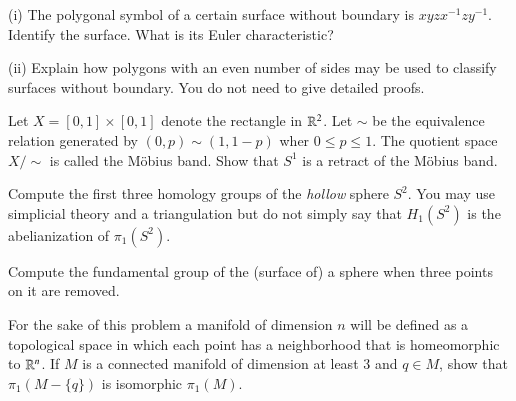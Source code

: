 \documentclass[12pt]{exam}
\theoremstyle{definition}
\newcommand{\R}{\mathcal{R}}
\def\R{{ \Bbb R}}
\begin{document}
\begin{questions}




\question

(i) The polygonal symbol of a certain surface without boundary is $xyzx^{-1}zy^{-1}$. Identify the surface. What
is its Euler characteristic?

(ii) Explain how polygons with an even number of sides may be used to classify surfaces without boundary. You do
not need to give detailed proofs.

\question

Let $X=[0,1] \times [0,1]$ denote the rectangle in $\R^2$. Let $\sim$  be the equivalence relation generated by
$(0,p) \sim (1, 1-p)$ wher $0 \le p \le 1$. The quotient space $X/{\sim}$ is called the  M\"obius band. Show that
$S^1$ is a retract of the M\"obius band.

\question

Compute the first three homology groups of the \emph{hollow} sphere $S^2$. You may use simplicial theory and a
triangulation but do not simply say that $H_1(S^2)$ is the abelianization of $\pi_1(S^2)$.




\question

\noindent Compute the fundamental group of the (surface of) a sphere when three points on it are removed.




\question

For the sake of this problem a manifold of dimension $n$ will be defined as a topological space in which each
point has a neighborhood that is homeomorphic to $\R^n$. If $M$ is a connected manifold of dimension at least $3$
and $q \in M$, show that $\pi_1(M - \{q\})$ is isomorphic $\pi_1(M )$.

\end{questions}
\end{document}
